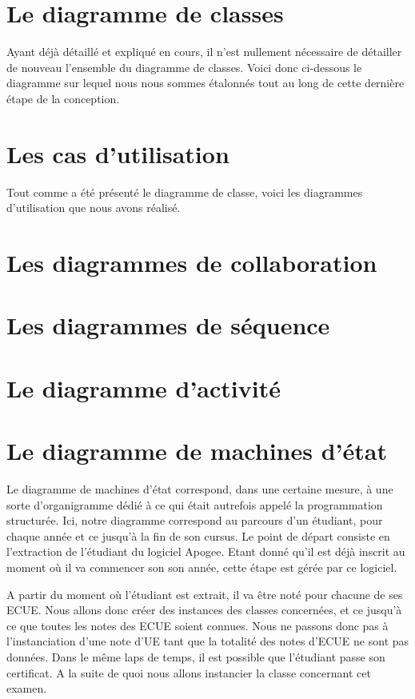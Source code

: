 \documentclass[letter, 11pt] {article}
\begin{document}
	\tableofcontents
	
	\section{Le diagramme de classes}
	
	Ayant déjà détaillé et expliqué en cours, il n'est nullement nécessaire de détailler de nouveau l'ensemble du diagramme de classes. Voici donc ci-dessous le diagramme sur lequel nous nous sommes étalonnés tout au long de cette dernière étape de la conception.
	
	\section{Les cas d'utilisation}
	
	Tout comme a été présenté le diagramme de classe, voici les diagrammes d'utilisation que nous avons réalisé.  
	
	\section{Les diagrammes de collaboration}
	
	\section{Les diagrammes de séquence}
	
	\section{Le diagramme d'activité}
	
	\section{Le diagramme de machines d'état}
	
	Le diagramme de machines d'état correspond, dans une certaine mesure, à une sorte d'organigramme dédié à ce qui était autrefois appelé la programmation structurée. Ici, notre diagramme correspond au parcours d'un étudiant, pour chaque année et ce jusqu'à la fin de son cursus.
	Le point de départ consiste en l'extraction de l'étudiant du logiciel Apogee. Etant donné qu'il est déjà inscrit au moment où il va commencer son son année, cette étape est gérée par ce logiciel.

	A partir du moment où l'étudiant est extrait, il va être noté pour chacune de ses ECUE. Nous allons donc créer des instances des classes concernées, et ce jusqu'à ce que toutes les notes des ECUE soient connues. Nous ne passons donc pas à l'instanciation d'une note d'UE tant que la totalité des notes d'ECUE ne sont pas données. Dans le même laps de temps, il est possible que l'étudiant passe son certificat. A la suite de quoi nous allons instancier la classe concernant cet examen.
\end{document}
